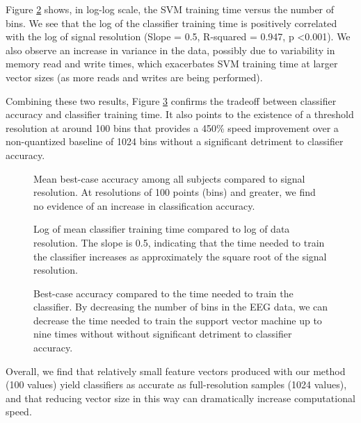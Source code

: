 Figure \ref{fig:training_vs_bins} shows, in log-log scale, the SVM training time versus the number of bins. We see that the log of the classifier training time is positively correlated with the log of signal resolution (Slope = 0.5, R-squared = 0.947, p \textless 0.001). We also observe an increase in variance in the data, possibly due to variability in memory read and write times, which exacerbates SVM training time at larger vector sizes (as more reads and writes are being performed).

Combining these two results, Figure \ref{fig:accuracy_vs_training} confirms the tradeoff between classifier accuracy and classifier training time. It also points to the existence of a threshold resolution at around 100 bins that provides a 450\% speed improvement over a non-quantized baseline of 1024 bins without a significant detriment to classifier accuracy.


\begin{figure}[!h]
  \centering
   {}
  \caption{Mean best-case accuracy among all subjects compared to signal resolution. At resolutions of 100 points (bins) and greater, we find no evidence of an increase in classification accuracy. }
  \label{fig:accuracy_vs_bins}
  \vspace{-0.1cm}
 \end{figure}

 \begin{figure}[!h]
  \vspace{-0.2cm}
  \centering
   {}
  \caption{Log of mean classifier training time compared to log of data resolution. The slope is 0.5, indicating that the time needed to train the classifier increases as approximately the square root of the signal resolution.}
  \label{fig:training_vs_bins}
  \vspace{-0.1cm}
 \end{figure}

\begin{figure}[!h]
  \vspace{-0.2cm}
  \centering
   {}
  \caption{ Best-case accuracy compared to the time needed to train the classifier. By decreasing the number of bins in the EEG data, we can decrease the time needed to train the support vector machine up to nine times without without significant detriment to classifier accuracy. }
  \label{fig:accuracy_vs_training}
 \end{figure}

Overall, we find that relatively small feature vectors produced with our method (100 values) yield classifiers as accurate as full-resolution samples (1024 values), and that reducing vector size in this way can dramatically increase computational speed.
